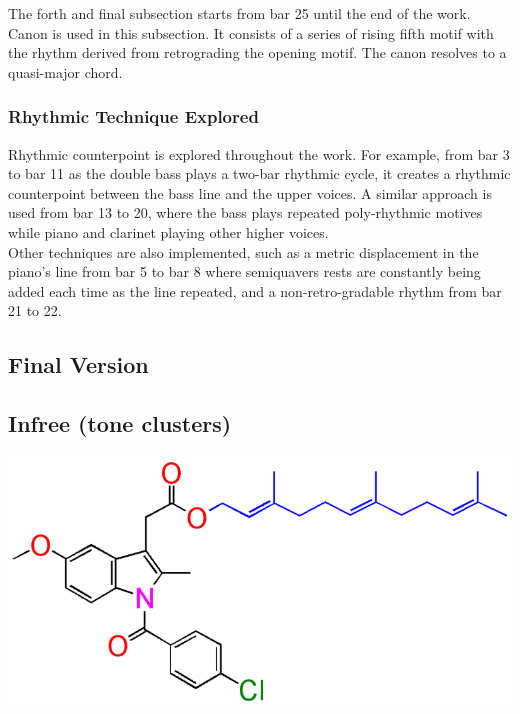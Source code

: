 \documentclass{article}
\begin{document}
The forth and final subsection starts from bar 25 until the end of the work. Canon is used in this subsection. It consists of a series of rising fifth motif with the rhythm derived from retrograding the opening motif. The canon resolves to a quasi-major chord.

\subsubsection{Rhythmic Technique Explored}
Rhythmic counterpoint is explored throughout the work. For example, from bar 3 to bar 11 as the double bass plays a two-bar rhythmic cycle, it creates a rhythmic counterpoint between the bass line and the upper voices. A similar approach is used from bar 13 to 20, where the bass plays repeated poly-rhythmic motives while piano and clarinet playing other higher voices.\\

Other techniques are also implemented, such as a metric displacement in the piano's line from bar 5 to bar 8 where semiquavers rests are constantly being added each time as the line repeated, and a non-retro-gradable rhythm from bar 21 to 22.

\subsection{Final Version}


\newpage

\begin{center}
\vspace*{\fill}
\LARGE
    \section{Infree (tone clusters)}
    \includegraphics[width=\textwidth]{infree.png}
\vspace*{\fill}
%
\end{center}
\end{document}
